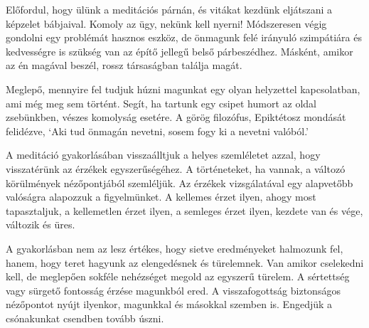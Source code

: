 \enlargethispage*{\baselineskip}

Előfordul, hogy ülünk a meditációs párnán, és vitákat kezdünk eljátszani
a képzelet bábjaival. Komoly az ügy, nekünk kell nyerni! Módszeresen
végig gondolni egy problémát hasznos eszköz, de önmagunk felé irányuló
szimpátiára és kedvességre is szükség van az építő jellegű belső
párbeszédhez. Másként, amikor az én magával beszél, rossz társaságban
találja magát.


Meglepő, mennyire fel tudjuk húzni magunkat egy olyan helyzettel
kapcsolatban, ami még meg sem történt. Segít, ha tartunk egy csipet
humort az oldal zsebünkben, vészes komolyság esetére. A görög filozófus,
Epiktétosz mondását felidézve, `Aki tud önmagán nevetni, sosem fogy ki a
nevetni valóból.'


A meditáció gyakorlásában visszaálltjuk a helyes szemléletet azzal, hogy
visszatérünk az érzékek egyszerűségéhez. A történeteket, ha vannak, a
változó körülmények nézőpontjából szemléljük. Az érzékek vizsgálatával
egy alapvetőbb valóságra alapozzuk a figyelmünket. A kellemes érzet
ilyen, ahogy most tapasztaljuk, a kellemetlen érzet ilyen, a semleges
érzet ilyen, kezdete van és vége, változik és üres.

A gyakorlásban nem az lesz értékes, hogy sietve eredményeket halmozunk
fel, hanem, hogy teret hagyunk az elengedésnek és türelemnek. Van amikor
cselekedni kell, de meglepően sokféle nehézséget megold az egyszerű
türelem. A sértettség vagy sürgető fontosság érzése magunkból ered. A
visszafogottság biztonságos nézőpontot nyújt ilyenkor, magunkkal és
másokkal szemben is. Engedjük a csónakunkat csendben tovább úszni.
